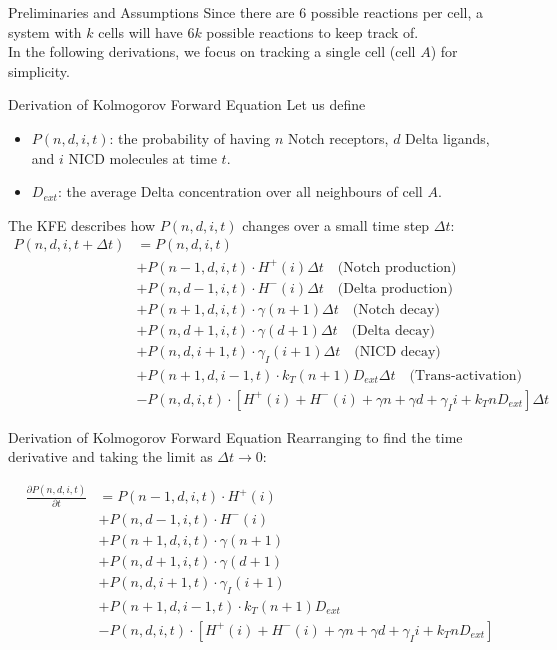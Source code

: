 \documentclass[aspectratio=169]{beamer}
\begin{document}
\begin{frame}{Preliminaries and Assumptions}
Since there are $6$ possible reactions per cell, a system with $k$ cells will have $6k$ possible reactions to keep track of. \\
\hfill\break
In the following derivations, we focus on tracking a single cell (cell $A$) for simplicity.
\end{frame}

\begin{frame}{Derivation of Kolmogorov Forward Equation}
Let us define
\begin{itemize}
    \small \item $P(n,d,i,t)$: the probability of having $n$ Notch receptors, $d$ Delta ligands, and $i$ NICD molecules at time $t$.
    \small \item $D_{ext}$: the average Delta concentration over all neighbours of cell $A$.
\end{itemize}
The KFE describes how $P(n,d,i,t)$ changes over a small time step $\Delta t$:
\small \begin{align*}
P(n,d,i,t+\Delta t) &= P(n,d,i,t) \\
&+ P(n-1,d,i,t) \cdot H^+(i) \Delta t \quad \text{(Notch production)} \\
&+ P(n,d-1,i,t) \cdot H^-(i) \Delta t \quad \text{(Delta production)} \\
&+ P(n+1,d,i,t) \cdot \gamma(n+1)\Delta t \quad \text{(Notch decay)} \\
&+ P(n,d+1,i,t) \cdot \gamma(d+1)\Delta t \quad \text{(Delta decay)} \\
&+ P(n,d,i+1,t) \cdot \gamma_I(i+1)\Delta t \quad \text{(NICD decay)} \\
&+ P(n+1,d,i-1,t) \cdot k_T(n+1)D_{ext}\Delta t \quad \text{(Trans-activation)} \\
&- P(n,d,i,t) \cdot [H^+(i) + H^-(i) + \gamma n + \gamma d + \gamma_I i + k_T n D_{ext}]\Delta t
\end{align*}
\end{frame}

\begin{frame}{Derivation of Kolmogorov Forward Equation}
Rearranging to find the time derivative and taking the limit as $\Delta t \rightarrow 0$:

\begin{align*}
\frac{\partial P(n,d,i,t)}{\partial t} &= P(n-1,d,i,t) \cdot H^+(i) \\
&+ P(n,d-1,i,t) \cdot H^-(i) \\
&+ P(n+1,d,i,t) \cdot \gamma(n+1) \\
&+ P(n,d+1,i,t) \cdot \gamma(d+1) \\
&+ P(n,d,i+1,t) \cdot \gamma_I(i+1) \\
&+ P(n+1,d,i-1,t) \cdot k_T(n+1)D_{ext} \\
&- P(n,d,i,t) \cdot [H^+(i) + H^-(i) + \gamma n + \gamma d + \gamma_I i + k_T n D_{ext}]
\end{align*}

\end{frame}
\end{document}
